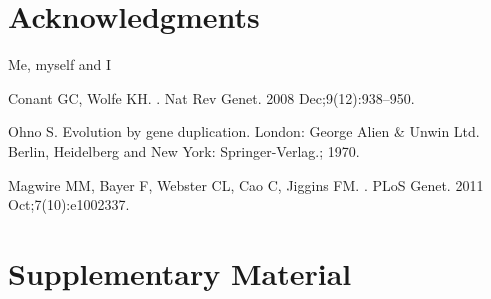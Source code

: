 \documentclass[10pt,letterpaper]{article}
\newcommand{\beginsupplement}{%
  \setcounter{table}{0}%
  \renewcommand{\thetable}{S\arabic{table}}%
  \setcounter{figure}{0}%
  \renewcommand{\thefigure}{S\arabic{figure}}}
\begin{document}
\section*{Acknowledgments}
Me, myself and I

\nolinenumbers

%
%
% 
\begin{thebibliography}{10}

Conant GC, Wolfe KH.
.
\newblock Nat Rev Genet. 2008 Dec;9(12):938--950.

Ohno S.
\newblock Evolution by gene duplication.
\newblock London: George Alien \& Unwin Ltd. Berlin, Heidelberg and New York:
  Springer-Verlag.; 1970.

Magwire MM, Bayer F, Webster CL, Cao C, Jiggins FM.
.
\newblock PLoS Genet. 2011 Oct;7(10):e1002337.

\end{thebibliography}

\FloatBarrier
\section*{Supplementary Material}
\beginsupplement
\end{document}
